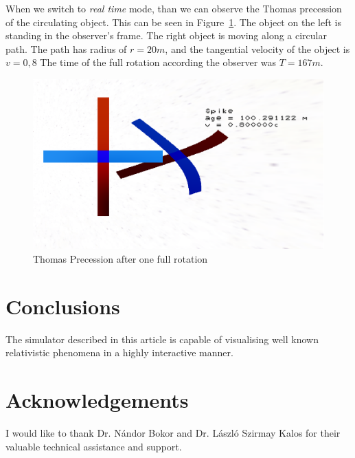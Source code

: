 \documentclass{egpubl}
\begin{document}
When we switch to \emph{real time} mode, than we can observe the Thomas precession of the circulating object. This can be seen in Figure~\ref{fig:thomasPrec}. The object on the left is standing in the observer's frame. The right object is moving along a circular path. The path has radius of $r=20m$, and the tangential velocity of the object is $v=0,8$
The time of the full rotation according the observer was $T=167m$.
\begin{figure}[htb]
  	\centering
	\includegraphics[width=.95\linewidth]{figures/ThomasPrecession.eps}
	\caption{Thomas Precession after one full rotation}
	\label{fig:thomasPrec}
\end{figure}


\section{Conclusions}
\label{sec:concl}
The simulator described in this article is capable of visualising well known relativistic phenomena in a highly interactive manner. 


\section*{Acknowledgements}
I would like to thank Dr. Nándor Bokor and Dr. László Szirmay Kalos for their valuable technical assistance and support.

\newpage
\end{document}
